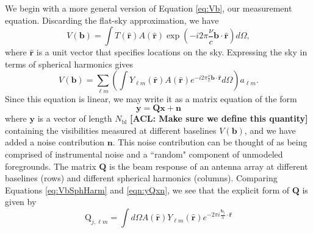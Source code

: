 \documentclass[twolcolumn,apj,iop,numberedappendix]{emulateapj}
\newcommand{\y}{\mathbf{y}}
\newcommand{\Q}{\mathbf{Q}}
\newcommand{\Nbl}{N_{\textrm{bl}}}
\newcommand{\acl}[1]{{\color{red} \textbf{[ACL:  #1]}}}
\begin{document}
We begin with a more general version of Equation \eqref{eq:Vb}, our measurement equation. Discarding the flat-sky approximation, we have
\begin{equation}
V(\mathbf{b}) = \int  T(\mathbf{\hat{r}}) A(\mathbf{\hat{r}}) \exp \left( -i 2 \pi \frac{\nu}{c} \mathbf{b} \cdot \mathbf{\hat{r}} \right) d\Omega,
\end{equation}
where $\mathbf{\hat{r}}$ is a unit vector that specifies locations on the sky. Expressing the sky in terms of spherical harmonics gives
\begin{equation}
\label{eq:VbSphHarm}
V(\mathbf{b}) = \sum_{\ell m} \left(  \int  Y_{\ell m} (\mathbf{\hat{r}}) A(\mathbf{\hat{r}}) e^{ -i 2 \pi \frac{\nu}{c} \mathbf{b} \cdot \mathbf{\hat{r}}} d\Omega \right) a_{\ell m}.
\end{equation}
Since this equation is linear, we may write it as a matrix equation of the form
\begin{equation}
\y = \Q \mathbf{x} + \mathbf{n}
\label{eqn:yQxn}
\end{equation}
where $\y$ is a vector of length $\Nbl$ \acl{Make sure we define this quantity} containing the visibilities measured at different baselines $V(\mathbf{b})$, and we have added a noise contribution $\mathbf{n}$. This noise contribution can be thought of as being comprised of instrumental noise and a ``random" component of unmodeled foregrounds. The matrix $\Q$ is the beam response of an antenna array at different baselines (rows) and different spherical harmonics (columns). Comparing Equations \eqref{eq:VbSphHarm} and \eqref{eqn:yQxn}, we see that the explicit form of $\Q$ is given by 
\begin{equation}
\textrm{Q}_{j,\ell m} = \int d\Omega A(\mathbf{\hat{r}}) Y_{\ell m}(\mathbf{\hat{r}}) e^{-2\pi i \frac{\mathbf{b_\textit{j}}}{\lambda} \cdot \mathbf{\hat{r}}}
\label{eqn:Qdef}
\end{equation}
\end{document}
